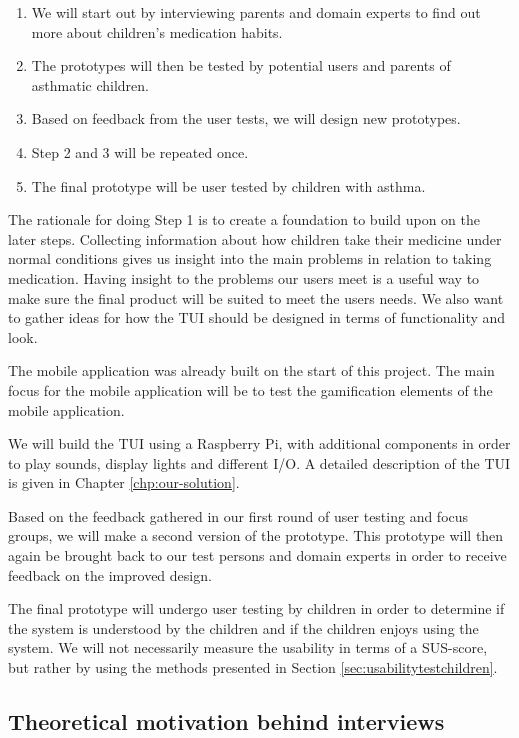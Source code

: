 \begin{enumerate}
  \item We will start out by interviewing parents and domain experts to find out more about children's medication habits.
  \item The prototypes will then be tested by potential users and parents of asthmatic children. 
  \item Based on feedback from the user tests, we will design new prototypes.
  \item Step 2 and 3 will be repeated once. 
  \item The final prototype will be user tested by children with asthma. 
\end{enumerate}
  
The rationale for doing Step 1 is to create a foundation to build upon on the later steps. 
Collecting information about how children take their medicine under normal conditions gives us insight into the main problems in relation to taking medication. Having insight to the problems our users meet is a useful way to make sure the final product will be suited to meet the users needs. We also want to gather ideas for how the TUI should be designed in terms of functionality and look.

The mobile application was already built on the start of this project. The main focus for the mobile application will be to test the gamification elements of the mobile application. 

We will build the TUI using a Raspberry Pi, with additional components in order to play sounds, display lights and different I/O. A detailed description of the TUI is given in Chapter \ref{chp:our-solution}. 


Based on the feedback gathered in our first round of user testing and focus groups, we will make a second version of the prototype. This prototype will then again be brought back to our test persons and domain experts in order to receive feedback on the improved design.

The final prototype will undergo user testing by children in order to determine if the system is understood by the children and if the children enjoys using the system. We will not necessarily measure the usability in terms of a SUS-score\cite{brooke1996sus}, but rather by using the methods presented in Section \ref{sec:usabilitytestchildren}.

\subsection{Theoretical motivation behind interviews}

